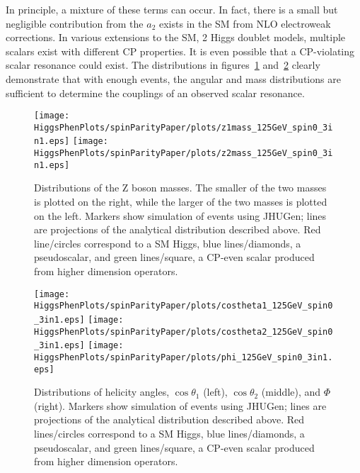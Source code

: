 In principle,
a mixture of these terms can occur.  In fact, there is a small but 
negligible contribution from the $a_2$ exists in the SM from NLO 
electroweak corrections.  In various extensions to the SM, 2 Higgs doublet
models, multiple scalars exist with different CP properties.  It is
even possible that a CP-violating scalar resonance could exist.  The 
distributions in figures~\ref{fig:ScalarMasses} 
and~\ref{fig:ScalarHelicityAngles} clearly demonstrate that with 
enough events, the angular and mass distributions are sufficient to 
determine the couplings of an observed scalar resonance.  

\begin{figure}
\begin{center}
\texttt{[image: HiggsPhenPlots/spinParityPaper/plots/z1mass\_125GeV\_spin0\_3in1.eps]}
\texttt{[image: HiggsPhenPlots/spinParityPaper/plots/z2mass\_125GeV\_spin0\_3in1.eps]}
\label{fig:ScalarMasses}
\caption{Distributions of the Z boson masses.  The smaller of the two masses is
plotted on the right, while the larger of the two masses is plotted on the
left. Markers show simulation of events using JHUGen; lines are projections
of the analytical distribution described above.  Red line/circles correspond
to a SM Higgs, blue lines/diamonds, a pseudoscalar, and green lines/square, 
a CP-even scalar produced from higher dimension operators.}
\end{center}
\end{figure}

\begin{figure}
\begin{center}
\texttt{[image: HiggsPhenPlots/spinParityPaper/plots/costheta1\_125GeV\_spin0\_3in1.eps]}
\texttt{[image: HiggsPhenPlots/spinParityPaper/plots/costheta2\_125GeV\_spin0\_3in1.eps]}
\texttt{[image: HiggsPhenPlots/spinParityPaper/plots/phi\_125GeV\_spin0\_3in1.eps]}
\label{fig:ScalarHelicityAngles}
\caption{Distributions of helicity angles, $\cos\theta_1$ (left), 
$\cos\theta_2$ (middle), and $\Phi$ (right). Markers show simulation of 
events using JHUGen; lines are projections
of the analytical distribution described above.  Red lines/circles correspond
to a SM Higgs, blue lines/diamonds, a pseudoscalar, and green lines/square, 
a CP-even scalar produced from higher dimension operators.}
\end{center}
\end{figure}

